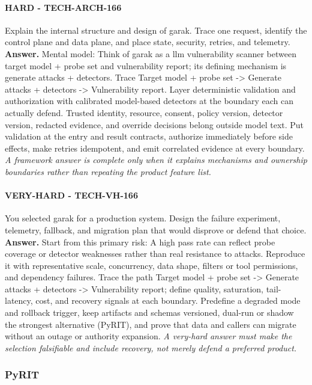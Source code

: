 \paragraph{HARD - TECH-ARCH-166} Explain the internal structure and design of garak. Trace one request, identify the control plane and data plane, and place state, security, retries, and telemetry.
\textbf{Answer.} Mental model: Think of garak as a llm vulnerability scanner between target model + probe set and vulnerability report; its defining mechanism is generate attacks + detectors. Trace Target model + probe set -> Generate attacks + detectors -> Vulnerability report. Layer deterministic validation and authorization with calibrated model-based detectors at the boundary each can actually defend. Trusted identity, resource, consent, policy version, detector version, redacted evidence, and override decisions belong outside model text. Put validation at the entry and result contracts, authorize immediately before side effects, make retries idempotent, and emit correlated evidence at every boundary.
\textit{A framework answer is complete only when it explains mechanisms and ownership boundaries rather than repeating the product feature list.}
\paragraph{VERY-HARD - TECH-VH-166} You selected garak for a production system. Design the failure experiment, telemetry, fallback, and migration plan that would disprove or defend that choice.
\textbf{Answer.} Start from this primary risk: A high pass rate can reflect probe coverage or detector weaknesses rather than real resistance to attacks. Reproduce it with representative scale, concurrency, data shape, filters or tool permissions, and dependency failures. Trace the path Target model + probe set -> Generate attacks + detectors -> Vulnerability report; define quality, saturation, tail-latency, cost, and recovery signals at each boundary. Predefine a degraded mode and rollback trigger, keep artifacts and schemas versioned, dual-run or shadow the strongest alternative (PyRIT), and prove that data and callers can migrate without an outage or authority expansion.
\textit{A very-hard answer must make the selection falsifiable and include recovery, not merely defend a preferred product.}
\subsubsection*{PyRIT}
